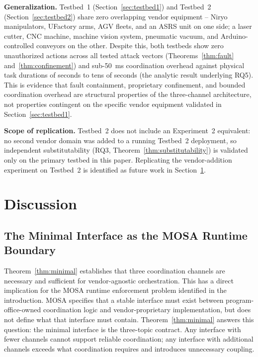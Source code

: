 \documentclass[a4paper,fleqn]{cas-dc}
\begin{document}
\textbf{Generalization.} Testbed~1 (Section~\ref{sec:testbed1}) and Testbed~2 (Section~\ref{sec:testbed2}) share zero overlapping vendor equipment -- Niryo manipulators, UFactory arms, AGV fleets, and an ASRS unit on one side; a laser cutter, CNC machine, machine vision system, pneumatic vacuum, and Arduino-controlled conveyors on the other. Despite this, both testbeds show zero unauthorized actions across all tested attack vectors (Theorems~\ref{thm:fault} and~\ref{thm:confinement}) and sub-50~ms coordination overhead against physical task durations of seconds to tens of seconds (the analytic result underlying RQ5). This is evidence that fault containment, proprietary confinement, and bounded coordination overhead are structural properties of the three-channel architecture, not properties contingent on the specific vendor equipment validated in Section~\ref{sec:testbed1}.

\textbf{Scope of replication.} Testbed~2 does not include an Experiment~2 equivalent: no second vendor domain was added to a running Testbed~2 deployment, so independent substitutability (RQ3, Theorem~\ref{thm:substitutability}) is validated only on the primary testbed in this paper. Replicating the vendor-addition experiment on Testbed~2 is identified as future work in Section~\ref{sec:discussion}.


\section{Discussion}
\label{sec:discussion}

\subsection{The Minimal Interface as the MOSA Runtime Boundary}

Theorem~\ref{thm:minimal} establishes that three coordination channels are necessary and sufficient for vendor-agnostic orchestration. This has a direct implication for the MOSA runtime enforcement problem identified in the introduction. MOSA specifies that a stable interface must exist between program-office-owned coordination logic and vendor-proprietary implementation, but does not define what that interface must contain. Theorem~\ref{thm:minimal} answers this question: the minimal interface is the three-topic contract. Any interface with fewer channels cannot support reliable coordination; any interface with additional channels exceeds what coordination requires and introduces unnecessary coupling.
\end{document}

